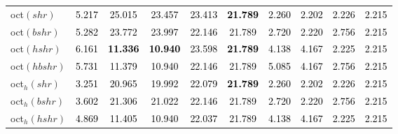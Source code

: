 \begin{tabular}[t]{l|>{}ccccccccc}
oct$(shr)$ & \textcolor{black}{5.217} & \textcolor{black}{25.015} & \textcolor{black}{23.457} & \textcolor{black}{23.413} & \textcolor{black}{\textbf{21.789}} & \textcolor{black}{2.260} & \textcolor{black}{2.202} & \textcolor{black}{2.226} & \textcolor{black}{2.215}\\
oct$(bshr)$ & \textcolor{black}{5.282} & \textcolor{black}{23.772} & \textcolor{black}{23.997} & \textcolor{black}{22.146} & \textcolor{black}{21.789} & \textcolor{black}{2.720} & \textcolor{black}{2.220} & \textcolor{black}{2.756} & \textcolor{black}{2.215}\\
oct$(hshr)$ & \textcolor{black}{6.161} & \textcolor{black}{\textbf{11.336}} & \textcolor{black}{\textbf{10.940}} & \textcolor{black}{23.598} & \textcolor{black}{\textbf{21.789}} & \textcolor{black}{4.138} & \textcolor{black}{4.167} & \textcolor{black}{2.225} & \textcolor{black}{2.215}\\
oct$(hbshr)$ & \textcolor{black}{5.731} & \textcolor{black}{11.379} & \textcolor{black}{10.940} & \textcolor{black}{22.146} & \textcolor{black}{21.789} & \textcolor{black}{5.085} & \textcolor{black}{4.167} & \textcolor{black}{2.756} & \textcolor{black}{2.215}\\
oct$_h(shr)$ & \textcolor{black}{3.251} & \textcolor{black}{20.965} & \textcolor{black}{19.992} & \textcolor{black}{22.079} & \textcolor{black}{\textbf{21.789}} & \textcolor{black}{2.260} & \textcolor{black}{2.202} & \textcolor{black}{2.226} & \textcolor{black}{2.215}\\
oct$_h(bshr)$ & \textcolor{black}{3.602} & \textcolor{black}{21.306} & \textcolor{black}{21.022} & \textcolor{black}{22.146} & \textcolor{black}{21.789} & \textcolor{black}{2.720} & \textcolor{black}{2.220} & \textcolor{black}{2.756} & \textcolor{black}{2.215}\\
oct$_h(hshr)$ & \textcolor{black}{4.869} & \textcolor{black}{11.405} & \textcolor{black}{10.940} & \textcolor{black}{22.037} & \textcolor{black}{21.789} & \textcolor{black}{4.138} & \textcolor{black}{4.167} & \textcolor{black}{2.225} & \textcolor{black}{2.215}\\
\bottomrule
\end{tabular}
